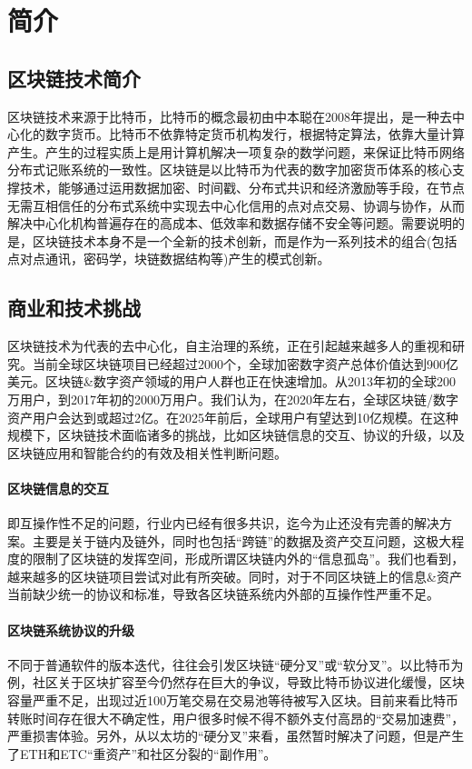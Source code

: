 \section{简介}

\subsection{区块链技术简介}
区块链技术来源于比特币\cite{Nakamoto2008}，比特币的概念最初由中本聪在2008年提出，是一种去中心化的数字货币。比特币不依靠特定货币机构发行，根据特定算法，依靠大量计算产生。产生的过程实质上是用计算机解决一项复杂的数学问题，来保证比特币网络分布式记账系统的一致性。区块链是以比特币为代表的数字加密货币体系的核心支撑技术，能够通过运用数据加密、时间戳、分布式共识和经济激励等手段，在节点无需互相信任的分布式系统中实现去中心化信用的点对点交易、协调与协作，从而解决中心化机构普遍存在的高成本、低效率和数据存储不安全等问题。需要说明的是，区块链技术本身不是一个全新的技术创新，而是作为一系列技术的组合(包括点对点通讯，密码学，块链数据结构等)产生的模式创新。

\subsection{商业和技术挑战}
区块链技术为代表的去中心化，自主治理的系统，正在引起越来越多人的重视和研究。当前全球区块链项目已经超过2000个，全球加密数字资产总体价值达到900亿美元。区块链\&数字资产领域的用户人群也正在快速增加。从2013年初的全球200万用户，到2017年初的2000万用户。我们认为，在2020年左右，全球区块链/数字资产用户会达到或超过2亿。在2025年前后，全球用户有望达到10亿规模。在这种规模下，区块链技术面临诸多的挑战，比如区块链信息的交互、协议的升级，以及区块链应用和智能合约的有效及相关性判断问题。

\paragraph{区块链信息的交互}即互操作性不足的问题，行业内已经有很多共识，迄今为止还没有完善的解决方案。主要是关于链内及链外，同时也包括“跨链”的数据及资产交互问题，这极大程度的限制了区块链的发挥空间，形成所谓区块链内外的“信息孤岛”。我们也看到，越来越多的区块链项目尝试对此有所突破。同时，对于不同区块链上的信息\&资产当前缺少统一的协议和标准，导致各区块链系统内外部的互操作性严重不足。

\paragraph{区块链系统协议的升级}不同于普通软件的版本迭代，往往会引发区块链“硬分叉”或“软分叉”。以比特币为例，社区关于区块扩容至今仍然存在巨大的争议，导致比特币协议进化缓慢，区块容量严重不足，出现过近100万笔交易在交易池等待被写入区块。目前来看比特币转账时间存在很大不确定性，用户很多时候不得不额外支付高昂的“交易加速费”，严重损害体验。另外，从以太坊的“硬分叉”来看，虽然暂时解决了问题，但是产生了ETH和ETC“重资产”和社区分裂的“副作用”。


